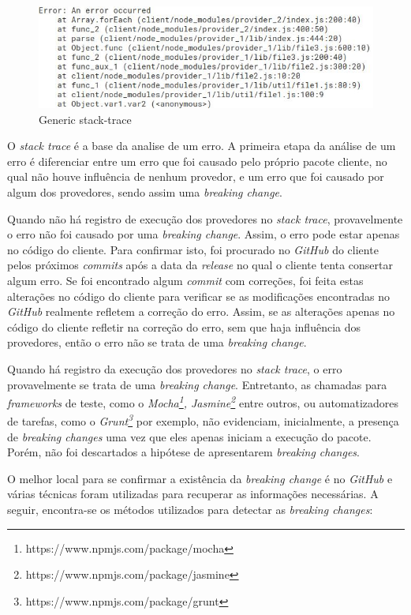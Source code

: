 \begin{figure}
    \centering
    \includegraphics[scale=0.7]{figuras/stack_trace.jpeg}
    \caption{Generic stack-trace}
    \label{fig:trace}
\end{figure}{}

O \textit{stack trace} é a base da analise de um erro. A primeira etapa da análise de um erro é diferenciar entre um erro que foi causado pelo próprio pacote cliente, no qual não houve influência de nenhum provedor, e um erro que foi causado por algum dos provedores, sendo assim uma \textit{breaking change}.

Quando não há registro de execução dos provedores no \textit{stack trace}, provavelmente o erro não foi causado por uma \textit{breaking change}. Assim, o erro pode estar apenas no código do cliente. Para confirmar isto, foi procurado no \textit{GitHub} do cliente pelos próximos \textit{commits} após a data da \textit{release} no qual o cliente tenta consertar algum erro. Se foi encontrado algum \textit{commit} com correções, foi feita estas alterações no código do cliente para verificar se as modificações encontradas no \textit{GitHub} realmente refletem a correção do erro. Assim, se as alterações apenas no código do cliente refletir na correção do erro, sem que haja influência dos provedores, então o erro não se trata de uma \textit{breaking change}.

Quando há registro da execução dos provedores no \textit{stack trace}, o erro provavelmente se trata de uma \textit{breaking change}. Entretanto, as chamadas para \textit{frameworks} de teste, como o \textit{Mocha\footnote{https://www.npmjs.com/package/mocha}, Jasmine\footnote{https://www.npmjs.com/package/jasmine}} entre outros, ou automatizadores de tarefas, como o \textit{Grunt\footnote{https://www.npmjs.com/package/grunt}} por exemplo, não evidenciam, inicialmente, a presença de \textit{breaking changes} uma vez que eles apenas iniciam a execução do pacote. Porém, não foi descartados a hipótese de apresentarem \textit{breaking changes}.

O melhor local para se confirmar a existência da \textit{breaking change} é no \textit{GitHub} e várias técnicas foram utilizadas para recuperar as informações necessárias. A seguir, encontra-se os métodos utilizados para detectar as \textit{breaking changes}:

